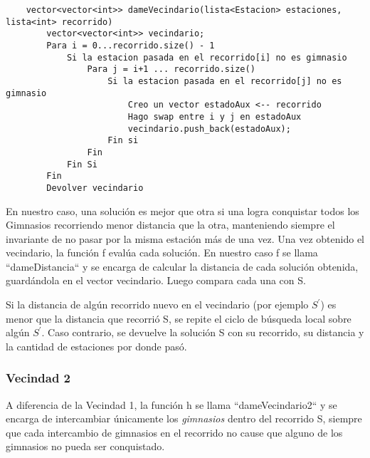     \begin{codesnippet}
    \begin{verbatim}
    vector<vector<int>> dameVecindario(lista<Estacion> estaciones, lista<int> recorrido)
        vector<vector<int>> vecindario;
        Para i = 0...recorrido.size() - 1
            Si la estacion pasada en el recorrido[i] no es gimnasio
                Para j = i+1 ... recorrido.size()
                    Si la estacion pasada en el recorrido[j] no es gimnasio
                        Creo un vector estadoAux <-- recorrido
                        Hago swap entre i y j en estadoAux
                        vecindario.push_back(estadoAux);
                    Fin si
                Fin
            Fin Si
        Fin
        Devolver vecindario
    \end{verbatim}
    \end{codesnippet}

    En nuestro caso, una solución es mejor que otra si una logra conquistar todos los Gimnasios recorriendo menor distancia que la otra, manteniendo siempre el invariante de no pasar por la misma estación más de una vez. 
    Una vez obtenido el vecindario, la función f evalúa cada solución. En nuestro caso f se llama “dameDistancia“ y se encarga de calcular la distancia de cada solución obtenida, guardándola en el vector vecindario. Luego compara cada una con S. 
    \par Si la distancia de algún recorrido nuevo en el vecindario (por ejemplo $S^{'}$) es menor que la distancia que recorrió S, se repite el ciclo de búsqueda local sobre algún $S^{'}$. Caso contrario, se devuelve la solución S con su recorrido, su distancia y la cantidad de estaciones por donde pasó.

   \subsubsection{Vecindad 2}

    \par A diferencia de la Vecindad 1, la función h se llama “dameVecindario2“ y se encarga de intercambiar únicamente los \emph{gimnasios} dentro del recorrido S, siempre que cada intercambio de gimnasios en el recorrido no cause que alguno de los gimnasios no pueda ser conquistado.

